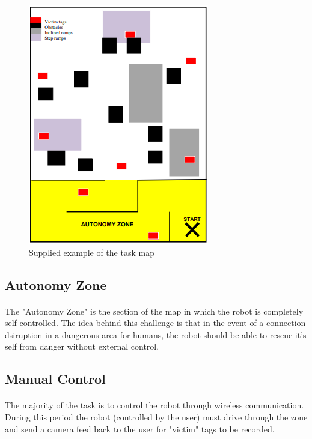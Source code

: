 \documentclass[12pt, a4paper]{article}
\begin{document}
\begin{figure}[h]
  \includegraphics{Images/AutonZone.png}
  \centering
  \caption{Supplied example of the task map}
  \label{fig:intro:map}
\end{figure}

\subsection{Autonomy Zone}
  \paragraph{}
    The "Autonomy Zone" is the section of the map in which the robot is completely self controlled. The idea behind this challenge is that in the event of a connection dsiruption in a dangerous area for humans, the robot should be able to rescue it's self from danger without external control.

\subsection{Manual Control}
 \paragraph{}
    The majority of the task is to control the robot through wireless communication. During this period the robot (controlled by the user) must drive through the zone and send a camera feed back to the user for "victim" tags to be recorded.


\newpage
\end{document}
